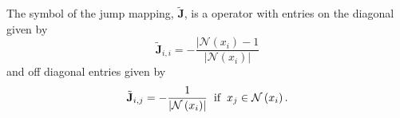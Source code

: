 \begin{definition}
The symbol of the jump mapping, $\tilde{\mathbf{J}}$, is a operator with entries on the diagonal given by
\begin{equation}
\tilde{\mathbf{J}}_{i, i} = - \frac{\lvert \mathcal{N} \left( x_i \right) - 1}{\lvert \mathcal{N} \left( x_i \right) \rvert}
\end{equation}
and off diagonal entries given by
\begin{equation}
\tilde{\mathbf{J}}_{i, j} = - \frac{1}{\lvert \mathcal{N} \left( x_i \right) \rvert} \hspace{2mm} \text{if} \hspace{2mm} x_j \in \mathcal{N} \left( x_i \right).
\end{equation}
\label{def:harmonic_injection_symbol}
\end{definition}
